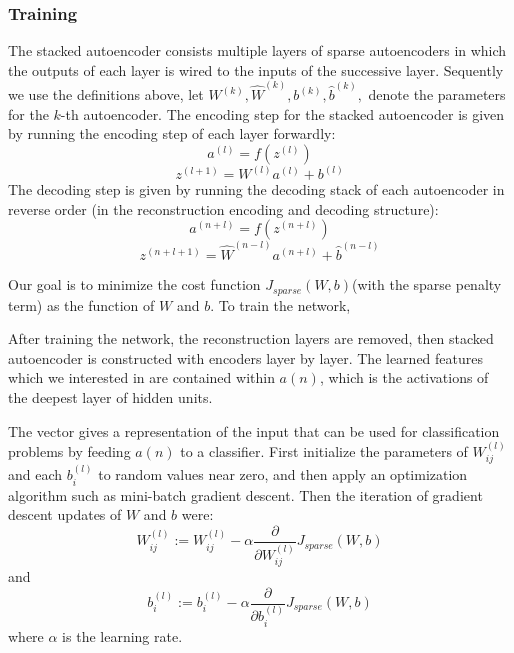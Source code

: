 \documentclass{bmcart}
\begin{document}
\subsubsection*{Training}
The stacked autoencoder consists multiple layers of sparse autoencoders in which the outputs of each layer is wired to the inputs of the successive layer. Sequently we use the definitions above, let $W^{(k)}, \hat{W}^{(k)}, b^{(k)}, \hat{b}^{(k)},$ denote the parameters for the $k$-th autoencoder. The encoding step for the stacked autoencoder is given by running the encoding step of each layer forwardly:
\begin{equation}
a^{(l)} = f(z^{(l)})
\end{equation}
\begin{equation}
z^{(l+1)} = W^{(l)}a^{(l)} + b^{(l)}
\end{equation}
The decoding step is given by running the decoding stack of each autoencoder in reverse order (in the reconstruction encoding and decoding structure):
\begin{equation}
a^{(n + l)} = f(z^{(n + l)}) 
\end{equation}
\begin{equation}
z^{(n + l + 1)} = \hat{W}^{(n - l)}a^{(n + l)} + \hat{b}^{(n - l)}
\end{equation}

Our goal is to minimize the cost function $J_{sparse}(W, b)$(with the sparse penalty term) as the function of $W$ and $b$. To train the network, 

After training the network, the reconstruction layers are removed, then stacked autoencoder is constructed with encoders layer by layer. The learned features which we interested in are contained within $a(n)$, which is the activations of the deepest layer of hidden units. 



The vector gives a representation of the input that can be used for classification problems by feeding $a(n)$ to a classifier. First initialize the parameters of $W^{(l)}_{ij}$ and each $b^{(l)}_i$ to random values near zero, and then apply an optimization algorithm such as mini-batch gradient descent. Then the iteration of gradient descent updates of $W$ and $b$ were:
\begin{equation}
W_{ij}^{(l)}  := W_{ij}^{(l)} - \alpha \frac{\partial}{\partial W_{ij}^{(l)}} J_{sparse}(W,b) 
\end{equation}
and
\begin{equation}
b_{i}^{(l)}  := b_{i}^{(l)} - \alpha \frac{\partial}{\partial b_{i}^{(l)}} J_{sparse}(W,b)
\end{equation}
where $\alpha$ is the learning rate.
\end{document}
